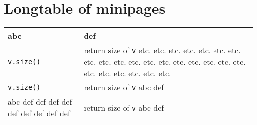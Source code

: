 \section{Longtable of minipages}

\begin{tabular}{|p{}|p{}|}
  \hline
  abc & def \\
  \hline \hline
  \texttt{v.size()} & return size of \texttt{v} etc. etc. etc. etc. etc. etc. etc. etc. etc. etc. etc. etc. etc. etc. etc. etc. etc. etc. etc. etc. etc. etc. etc. etc.  \\
  \hline
  \texttt{v.size()} & return size of \texttt{v} \newline
                      abc def \newline
  \\
  \hline
  abc def def def def def def def def def  & return size of \texttt{v} \newline
                      abc def \newline
  \\
  \hline
\end{tabular}
